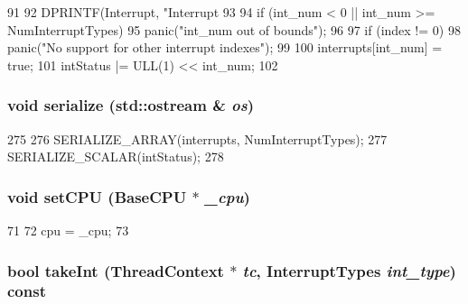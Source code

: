 \begin{DoxyCode}
91     {
92         DPRINTF(Interrupt, "Interrupt %
93 
94         if (int_num < 0 || int_num >= NumInterruptTypes)
95             panic("int_num out of bounds\n");
96 
97         if (index != 0)
98             panic("No support for other interrupt indexes\n");
99 
100         interrupts[int_num] = true;
101         intStatus |= ULL(1) << int_num;
102     }
\end{DoxyCode}
\hypertarget{classArmISA_1_1Interrupts_a53e036786d17361be4c7320d39c99b84}{
\subsubsection[{serialize}]{\setlength{\rightskip}{0pt plus 5cm}void serialize (std::ostream \& {\em os})}}
\label{classArmISA_1_1Interrupts_a53e036786d17361be4c7320d39c99b84}



\begin{DoxyCode}
275     {
276         SERIALIZE_ARRAY(interrupts, NumInterruptTypes);
277         SERIALIZE_SCALAR(intStatus);
278     }
\end{DoxyCode}
\hypertarget{classArmISA_1_1Interrupts_a2ab8c6aed9969bc58d6aa2427d442cc4}{
\subsubsection[{setCPU}]{\setlength{\rightskip}{0pt plus 5cm}void setCPU ({\bf BaseCPU} $\ast$ {\em \_\-cpu})}}
\label{classArmISA_1_1Interrupts_a2ab8c6aed9969bc58d6aa2427d442cc4}



\begin{DoxyCode}
71     {
72         cpu = _cpu;
73     }
\end{DoxyCode}
\hypertarget{classArmISA_1_1Interrupts_a50dda1dd4fbbbf90b50f55cc0a712264}{
\subsubsection[{takeInt}]{\setlength{\rightskip}{0pt plus 5cm}bool takeInt ({\bf ThreadContext} $\ast$ {\em tc}, \/  {\bf InterruptTypes} {\em int\_\-type}) const}}
\label{classArmISA_1_1Interrupts_a50dda1dd4fbbbf90b50f55cc0a712264}



